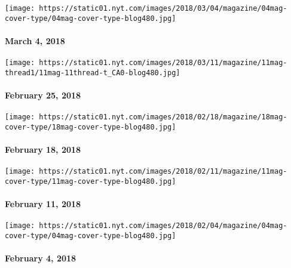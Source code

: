 \href{https://www.nytimes.com/issue/magazine/2018/03/30/3418-issue}{}

\texttt{[image: https://static01.nyt.com/images/2018/03/04/magazine/04mag-cover-type/04mag-cover-type-blog480.jpg]}

\hypertarget{march-4-2018}{%
\paragraph{March 4, 2018}\label{march-4-2018}}

\href{https://www.nytimes.com/issue/magazine/2018/03/30/022518}{}

\texttt{[image: https://static01.nyt.com/images/2018/03/11/magazine/11mag-thread1/11mag-11thread-t\_CA0-blog480.jpg]}

\hypertarget{february-25-2018}{%
\paragraph{February 25, 2018}\label{february-25-2018}}

\href{https://www.nytimes.com/issue/magazine/2018/02/16/21818-issue}{}

\texttt{[image: https://static01.nyt.com/images/2018/02/18/magazine/18mag-cover-type/18mag-cover-type-blog480.jpg]}

\hypertarget{february-18-2018}{%
\paragraph{February 18, 2018}\label{february-18-2018}}

\href{https://www.nytimes.com/issue/magazine/2018/02/09/21118-issue}{}

\texttt{[image: https://static01.nyt.com/images/2018/02/11/magazine/11mag-cover-type/11mag-cover-type-blog480.jpg]}

\hypertarget{february-11-2018}{%
\paragraph{February 11, 2018}\label{february-11-2018}}

\href{https://www.nytimes.com/interactive/2018/01/30/magazine/winter-olympics-alpine-skiing-lindsey-vonn-workout.html}{}

\texttt{[image: https://static01.nyt.com/images/2018/02/04/magazine/04mag-cover-type/04mag-cover-type-blog480.jpg]}

\hypertarget{february-4-2018}{%
\paragraph{February 4, 2018}\label{february-4-2018}}

